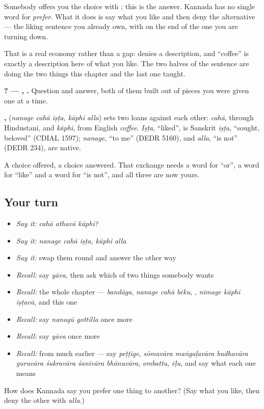 Somebody offers you the choice with ; this is the answer. Kannada has no single word for \emph{prefer}. What it does is say what you like and then deny the alternative — the liking sentence you already own, with  on the end of the one you are turning down.

That is a real economy rather than a gap:  denies a description, and \textquotedblleft{}coffee\textquotedblright{} is exactly a description here of what you like. The two halves of the sentence are doing the two things this chapter and the last one taught.

\textbf{  ? —   ,  .} Question and answer, both of them built out of pieces you were given one at a time.

\begin{cousinweb}
\textbf{  ,  } (\emph{nanage cahā iṣṭa, kāphi alla}) sets two loans against each other: \emph{cahā}, through Hindustani, and \emph{kāphi}, from English \emph{coffee}. \emph{Iṣṭa}, \textquotedblleft{}liked\textquotedblright{}, is Sanskrit \emph{iṣṭa}, \textquotedblleft{}sought, beloved\textquotedblright{} (CDIAL 1597); \emph{nanage}, \textquotedblleft{}to me\textquotedblright{} (DEDR 5160), and \emph{alla}, \textquotedblleft{}is not\textquotedblright{} (DEDR 234), are native.
\end{cousinweb}

\begin{grammarlens}[title={What you've built}]
A choice offered, a choice answered. That exchange needs a word for \textquotedblleft{}or\textquotedblright{}, a word for \textquotedblleft{}like\textquotedblright{} and a word for \textquotedblleft{}is not\textquotedblright{}, and all three are now yours.
\end{grammarlens}

\subsection*{Your turn}
\begin{itemize}
\raggedright
  \item \emph{Say it:} \emph{cahā athavā kāphi?}
  \item \emph{Say it:} \emph{nanage cahā iṣṭa, kāphi alla}
  \item \emph{Say it:} swap them round and answer the other way
  \item \emph{Recall:} say \emph{yāva}, then ask which of two things somebody wants
  \item \emph{Recall:} the whole chapter — \emph{bandāga}, \emph{nanage cahā bēku}, \emph{}, \emph{nimage kāphi iṣṭavā}, and this one
  \item \emph{Recall:} say \emph{nanagū gottilla} once more
  \item \emph{Recall:} say \emph{yāva} once more
  \item \emph{Recall:} from much earlier — say \emph{peṭṭige}, \emph{sōmavāra maṅgaḷavāra budhavāra guruvāra śukravāra śanivāra bhānuvāra}, \emph{ombattu}, \emph{ēḷu}, and say what each one means
\end{itemize}

\begin{tcolorbox}[breakable,colback=teal!4,colframe=teal!35!black,title={Before you move on}]
How does Kannada say you prefer one thing to another? (Say what you like, then deny the other with \emph{alla}.)
\end{tcolorbox}
